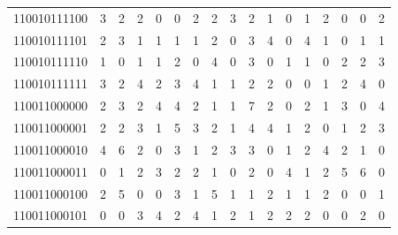 \documentclass[10pt,a4paper]{article}
\begin{document}
\begin{longtable}{ |c|c|c|c|c|c|c|c|c|c|c|c|c|c|c|c|c| }
    110010111100              & 3                            & 2                                & 2                            & 0                              & 0   & 2   & 2   & 3   & 2   & 1   & 0   & 1   & 2   & 0   & 0   & 2   \\
    110010111101              & 2                            & 3                                & 1                            & 1                              & 1   & 1   & 2   & 0   & 3   & 4   & 0   & 4   & 1   & 0   & 1   & 1   \\
    110010111110              & 1                            & 0                                & 1                            & 1                              & 2   & 0   & 4   & 0   & 3   & 0   & 1   & 1   & 0   & 2   & 2   & 3   \\
    110010111111              & 3                            & 2                                & 4                            & 2                              & 3   & 4   & 1   & 1   & 2   & 2   & 0   & 0   & 1   & 2   & 4   & 0   \\
    110011000000              & 2                            & 3                                & 2                            & 4                              & 4   & 2   & 1   & 1   & 7   & 2   & 0   & 2   & 1   & 3   & 0   & 4   \\
    110011000001              & 2                            & 2                                & 3                            & 1                              & 5   & 3   & 2   & 1   & 4   & 4   & 1   & 2   & 0   & 1   & 2   & 3   \\
    110011000010              & 4                            & 6                                & 2                            & 0                              & 3   & 1   & 2   & 3   & 3   & 0   & 1   & 2   & 4   & 2   & 1   & 0   \\
    110011000011              & 0                            & 1                                & 2                            & 3                              & 2   & 2   & 1   & 0   & 2   & 0   & 4   & 1   & 2   & 5   & 6   & 0   \\
    110011000100              & 2                            & 5                                & 0                            & 0                              & 3   & 1   & 5   & 1   & 1   & 2   & 1   & 1   & 2   & 0   & 0   & 1   \\
    110011000101              & 0                            & 0                                & 3                            & 4                              & 2   & 4   & 1   & 2   & 1   & 2   & 2   & 2   & 0   & 0   & 2   & 0   \\

\end{longtable}
\end{document}
